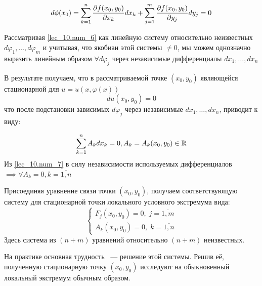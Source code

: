 \documentclass[../../main.tex]{subfiles}
\begin{document}
\begin{equation} \label{lec_10.num_6}
	d\phi(x_0) = \sum_{k = 1}^{n} \frac{\partial  f(x_0, y_0) }{\partial x_k} 
	dx_k + \sum_{j = 1}^{m} \frac{\partial  f(x_0, y_0) }{\partial y_j} dy_j = 0
\end{equation}

Рассматривая \ref{lec_10.num_6} как линейную систему относительно неизвестных
$d\varphi_1, \ldots, d\varphi_m$ и учитывая, что якобиан этой системы $\ne 0$,
мы можем однозначно выразить линейным образом $\forall d\varphi_j$
через независимые дифференциалы $dx_1, \ldots, dx_n$

В результате получаем, что в рассматриваемой точке $(x_0, y_0)$
являющейся стационарной для $u = u\left( x, \varphi(x) \right)$
\[ du(x_0, y_0) = 0 \]
что после подстановки зависимых $d\varphi_j$ через независимые 
$dx_1, \ldots, dx_n$, приводит к виду:

\begin{equation} \label{lec_10.num_7}
	\sum_{k = 1}^{n} A_k dx_k = 0, A_k = A_k(x_0, y_0) \in \mathbb{R}
\end{equation}
Из \ref{lec_10.num_7} в силу независимости используемых дифференциалов 
$\implies \forall A_k = 0, k = \overline{1, n}$

Присоединяя уравнение связи точки $(x_0, y_0)$, получаем 
соответствующую систему для стационарной точки локального 
условного экстремума вида:
\[ \begin{cases}
	F_j(x_0, y_0) = 0, \; j = \overline{1, m} \\
	A_k(x_0, y_0) = 0, \; k = \overline{1, n}
\end{cases} \]
Здесь система из $(n + m)$ уравнений относительно $(n+m)$ неизвестных.

На практике основная трудность ~--- решение этой системы.
Решив её, полученную стационарную точку $(x_0, y_0)$ исследуют
на обыкновенный локальный экстремум обычным образом.
\end{document}
